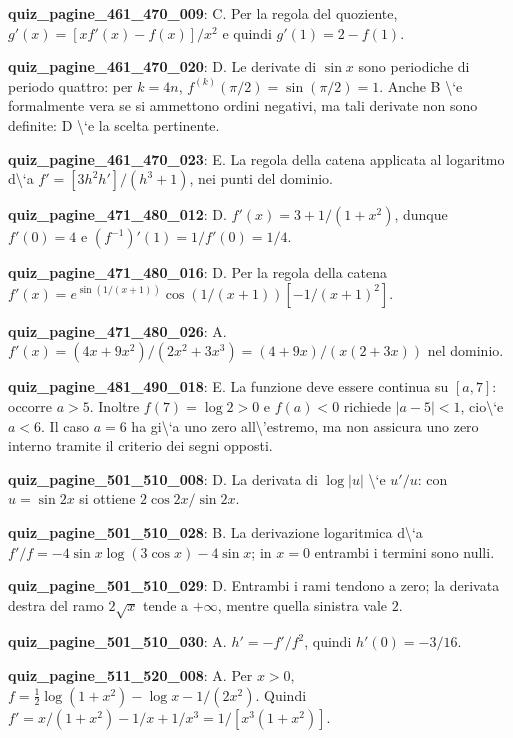 \documentclass[11pt,a4paper]{article}
\newcounter{quiz}
\begin{document}
\noindent\textbf{quiz\_pagine\_461\_470\_009}: C. Per la regola del quoziente, $g\prime(x)=[xf\prime(x)-f(x)]/x^2$ e quindi $g\prime(1)=2-f(1)$.\par\medskip
\noindent\textbf{quiz\_pagine\_461\_470\_020}: D. Le derivate di $\sin x$ sono periodiche di periodo quattro: per $k=4n$, $f^{(k)}(\pi/2)=\sin(\pi/2)=1$. Anche B \textbackslash{}`e formalmente vera se si ammettono ordini negativi, ma tali derivate non sono definite: D \textbackslash{}`e la scelta pertinente.\par\medskip
\noindent\textbf{quiz\_pagine\_461\_470\_023}: E. La regola della catena applicata al logaritmo d\textbackslash{}`a $f\prime=[3h^2h\prime]/(h^3+1)$, nei punti del dominio.\par\medskip
\noindent\textbf{quiz\_pagine\_471\_480\_012}: D. $f'(x)=3+1/(1+x^2)$, dunque $f'(0)=4$ e $(f^{-1})'(1)=1/f'(0)=1/4$.\par\medskip
\noindent\textbf{quiz\_pagine\_471\_480\_016}: D. Per la regola della catena $f'(x)=e^{\sin(1/(x+1))}\cos(1/(x+1))[-1/(x+1)^2]$.\par\medskip
\noindent\textbf{quiz\_pagine\_471\_480\_026}: A. $f'(x)=(4x+9x^2)/(2x^2+3x^3)=(4+9x)/(x(2+3x))$ nel dominio.\par\medskip
\noindent\textbf{quiz\_pagine\_481\_490\_018}: E. La funzione deve essere continua su $[a,7]$: occorre $a>5$. Inoltre $f(7)=\log2>0$ e $f(a)<0$ richiede $|a-5|<1$, cio\textbackslash{}`e $a<6$. Il caso $a=6$ ha gi\textbackslash{}`a uno zero all\textbackslash{}'estremo, ma non assicura uno zero interno tramite il criterio dei segni opposti.\par\medskip
\noindent\textbf{quiz\_pagine\_501\_510\_008}: D. La derivata di $\log|u|$ \textbackslash{}`e $u\prime/u$: con $u=\sin2x$ si ottiene $2\cos2x/\sin2x$.\par\medskip
\noindent\textbf{quiz\_pagine\_501\_510\_028}: B. La derivazione logaritmica d\textbackslash{}`a $f\prime/f=-4\sin x\log(3\cos x)-4\sin x$; in $x=0$ entrambi i termini sono nulli.\par\medskip
\noindent\textbf{quiz\_pagine\_501\_510\_029}: D. Entrambi i rami tendono a zero; la derivata destra del ramo $2\sqrt x$ tende a $+\infty$, mentre quella sinistra vale $2$.\par\medskip
\noindent\textbf{quiz\_pagine\_501\_510\_030}: A. $h\prime=-f\prime/f^2$, quindi $h\prime(0)=-3/16$.\par\medskip
\noindent\textbf{quiz\_pagine\_511\_520\_008}: A. Per $x>0$, $f=\frac12\log(1+x^2)-\log x-1/(2x^2)$. Quindi $f'=x/(1+x^2)-1/x+1/x^3=1/[x^3(1+x^2)]$.\par\medskip
\end{document}
